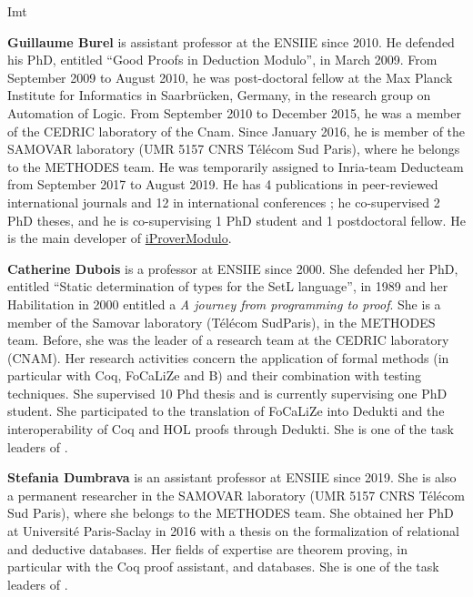 \begin{sitedescription}{Imt}
\begin{compactitem}
\item{\bf Guillaume Burel}
 is
assistant professor at the ENSIIE since 2010. He defended his PhD,
entitled ``Good Proofs in Deduction Modulo'', in March 2009. From
September 2009 to August 2010, he was post-doctoral fellow at the Max
Planck Institute for Informatics in Saarbr\"ucken, Germany, in the
research group on Automation of Logic. From September 2010 to December
2015, he was a member of the CEDRIC laboratory of the Cnam. Since
January 2016, he is member of the SAMOVAR laboratory (UMR 5157 CNRS
T\'el\'ecom Sud Paris), where he belongs to the METHODES team. He was
temporarily assigned to Inria-team Deducteam from September 2017 to
August 2019.  He has 4
publications in peer-reviewed international journals and 12 in
international conferences ; he co-supervised 2 PhD theses, and he is
co-supervising 1 PhD student and 1 postdoctoral fellow. He is the
main developer of
\href{http://www.ensiie.fr/~guillaume.burel/blackandwhite_iProverModulo.html.en}{iProverModulo}.

\item {\bf Catherine Dubois} is a professor at ENSIIE since 2000. She defended her PhD, entitled ``Static determination of types for the SetL language'', in 1989 and her Habilitation in 2000 entitled a
\emph{A journey from programming to proof}. She is a
member of the Samovar laboratory (T\'el\'ecom
SudParis), in the METHODES team. Before, she was the leader of a research team at the CEDRIC laboratory (CNAM). Her research activities concern the application of formal methods (in particular with Coq, FoCaLiZe and B) and their combination with testing techniques. She supervised 10 Phd thesis and is currently supervising one PhD student. She participated to the translation of FoCaLiZe into Dedukti and the interoperability of Coq and HOL proofs through Dedukti.
She is one of the task leaders of .

\item{\bf Stefania Dumbrava}
is an assistant professor at ENSIIE since 2019. She is also a permanent researcher in the SAMOVAR laboratory (UMR 5157 CNRS T\'el\'ecom
Sud Paris), where she belongs to the METHODES team. She obtained her PhD at Universit\'e Paris-Saclay in 2016 with a thesis on the formalization
of relational and deductive databases. Her fields of expertise are theorem proving, in particular with the Coq proof assistant, and databases.
She is one of the task leaders of .
\end{compactitem}


\end{sitedescription}

